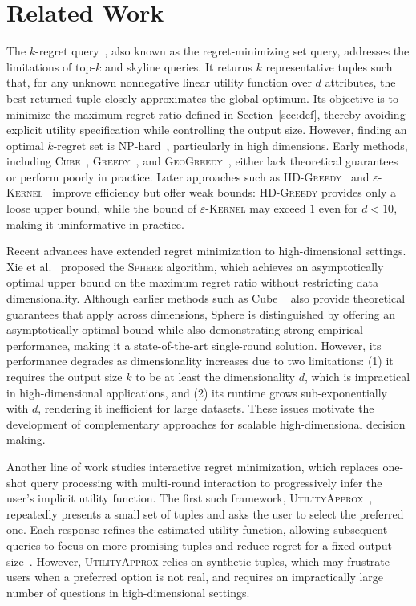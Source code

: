 \section{Related Work}
\label{sec:related}

The $k$-regret query~\cite{NS10}, also known as the regret-minimizing set query, addresses the limitations of top-$k$ and skyline queries. It returns $k$ representative tuples such that, for any unknown nonnegative linear utility function over $d$ attributes, the best returned tuple closely approximates the global optimum. Its objective is to minimize the maximum regret ratio defined in Section~\ref{sec:def}, thereby avoiding explicit utility specification while controlling the output size. However, finding an optimal $k$-regret set is NP-hard~\cite{AK17, CL17, CT14}, particularly in high dimensions. Early methods, including \textsc{Cube}~\cite{NS10}, \textsc{Greedy}~\cite{NS10}, and \textsc{GeoGreedy}~\cite{PW14}, either lack theoretical guarantees or perform poorly in practice. Later approaches such as \textsc{HD-Greedy}~\cite{asudeh2017efficient} and $\varepsilon$-\textsc{Kernel}~\cite{CL17} improve efficiency but offer weak bounds: \textsc{HD-Greedy} provides only a loose upper bound, while the bound of $\varepsilon$-\textsc{Kernel} may exceed $1$ even for $d<10$, making it uninformative in practice.

Recent advances have extended regret minimization to high-dimensional settings. Xie et al.~\cite{XW18} proposed the \textsc{Sphere} algorithm, which achieves an asymptotically optimal upper bound on the maximum regret ratio without restricting data dimensionality. Although earlier methods such as Cube ~\cite{NS10} also provide theoretical guarantees that apply across dimensions, Sphere is distinguished by offering an asymptotically optimal bound while also demonstrating strong empirical performance, making it a state-of-the-art single-round solution. However, its performance degrades as dimensionality increases due to two limitations: (1) it requires the output size $k$ to be at least the dimensionality $d$, which is impractical in high-dimensional applications, and (2) its runtime grows sub-exponentially with $d$, rendering it inefficient for large datasets. These issues motivate the development of complementary approaches for scalable high-dimensional decision making.

Another line of work studies interactive regret minimization, which replaces one-shot query processing with multi-round interaction to progressively infer the user’s implicit utility function. The first such framework, \textsc{UtilityApprox}~\cite{NL12}, repeatedly presents a small set of tuples and asks the user to select the preferred one. Each response refines the estimated utility function, allowing subsequent queries to focus on more promising tuples and reduce regret for a fixed output size~\cite{NL12}. However, \textsc{UtilityApprox} relies on synthetic tuples, which may frustrate users when a preferred option is not real, and requires an impractically large number of questions in high-dimensional settings.

